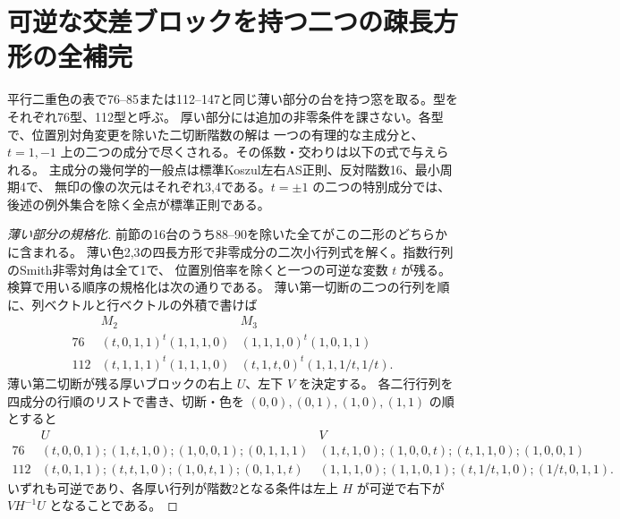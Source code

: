 \section{可逆な交差ブロックを持つ二つの疎長方形の全補完}
\label{sec:parallel-invertible-rectangles}
\begin{theorem}\label{thm:parallel-invertible-rectangles}
平行二重色の表で76--85または112--147と同じ薄い部分の台を持つ窓を取る。型をそれぞれ76型、112型と呼ぶ。
厚い部分には追加の非零条件を課さない。各型で、位置別対角変更を除いた二切断階数の解は
一つの有理的な主成分と、$t=1,-1$ 上の二つの成分で尽くされる。その係数・交わりは以下の式で与えられる。
主成分の幾何学的一般点は標準Koszul左右AS正則、反対階数16、最小周期4で、
無印の像の次元はそれぞれ3,4である。$t=\pm1$ の二つの特別成分では、後述の例外集合を除く全点が標準正則である。
\end{theorem}

\begin{proof}[薄い部分の規格化]
前節の16台のうち88--90を除いた全てがこの二形のどちらかに含まれる。
薄い色2,3の四長方形で非零成分の二次小行列式を解く。指数行列のSmith非零対角は全て1で、
位置別倍率を除くと一つの可逆な変数 $t$ が残る。検算で用いる順序の規格化は次の通りである。
薄い第一切断の二つの行列を順に、列ベクトルと行ベクトルの外積で書けば
\[
\begin{array}{c|cc}
 & M_2 & M_3\\\hline
76 &(t,0,1,1)^t(1,1,1,0)&(1,1,1,0)^t(1,0,1,1)\\
112 &(t,1,1,1)^t(1,1,1,0)&(t,1,t,0)^t(1,1,1/t,1/t).
\end{array}
\]
薄い第二切断が残る厚いブロックの右上 $U$、左下 $V$ を決定する。
各二行行列を四成分の行順のリストで書き、切断・色を $(0,0),(0,1),(1,0),(1,1)$ の順とすると
\[
\begin{array}{c|l|l}
 &U&V\\\hline
76 &(t,0,0,1);(1,t,1,0);(1,0,0,1);(0,1,1,1)
   &(1,t,1,0);(1,0,0,t);(t,1,1,0);(1,0,0,1)\\
112&(t,0,1,1);(t,t,1,0);(1,0,t,1);(0,1,1,t)
   &(1,1,1,0);(1,1,0,1);(t,1/t,1,0);(1/t,0,1,1).
\end{array}
\]
いずれも可逆であり、各厚い行列が階数2となる条件は左上 $H$ が可逆で右下が $V H^{-1}U$ となることである。
\end{proof}

